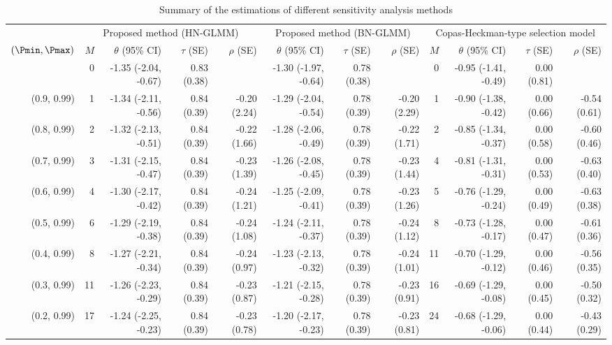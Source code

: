 \begin{table}

\caption{\label{tab:tab}Summary of the estimations of different sensitivity analysis methods}
\centering
\begin{threeparttable}
\begin{tabular}[t]{rrrrrrrrrrrr}
\toprule
\multicolumn{1}{c}{ } & \multicolumn{4}{c}{Proposed method (HN-GLMM)} & \multicolumn{3}{c}{Proposed method (BN-GLMM)} & \multicolumn{4}{c}{Copas-Heckman-type selection model} \\
\cmidrule(l{3pt}r{3pt}){2-5} \cmidrule(l{3pt}r{3pt}){6-8} \cmidrule(l{3pt}r{3pt}){9-12}
$(\Pmin, \Pmax)$ & $M$ & $\theta$ (95\% CI) & $\tau$ (SE) & $\rho$ (SE) & $\theta$ (95\% CI) & $\tau$ (SE) & $\rho$ (SE) & $M$ & $\theta$ (95\% CI) & $\tau$ (SE) & $\rho$ (SE)\\
\midrule
 & 0 & -1.35 (-2.04, -0.67) & 0.83 (0.38) &  & -1.30 (-1.97, -0.64) & 0.78 (0.38) &  & 0 & -0.95 (-1.41, -0.49) & 0.00 (0.81) & \\
(0.9, 0.99) & 1 & -1.34 (-2.11, -0.56) & 0.84 (0.39) & -0.20 (2.24) & -1.29 (-2.04, -0.54) & 0.78 (0.39) & -0.20 (2.29) & 1 & -0.90 (-1.38, -0.42) & 0.00 (0.66) & -0.54 (0.61)\\
(0.8, 0.99) & 2 & -1.32 (-2.13, -0.51) & 0.84 (0.39) & -0.22 (1.66) & -1.28 (-2.06, -0.49) & 0.78 (0.39) & -0.22 (1.71) & 2 & -0.85 (-1.34, -0.37) & 0.00 (0.58) & -0.60 (0.46)\\
(0.7, 0.99) & 3 & -1.31 (-2.15, -0.47) & 0.84 (0.39) & -0.23 (1.39) & -1.26 (-2.08, -0.45) & 0.78 (0.39) & -0.23 (1.44) & 4 & -0.81 (-1.31, -0.31) & 0.00 (0.53) & -0.63 (0.40)\\
(0.6, 0.99) & 4 & -1.30 (-2.17, -0.42) & 0.84 (0.39) & -0.24 (1.21) & -1.25 (-2.09, -0.41) & 0.78 (0.39) & -0.23 (1.26) & 5 & -0.76 (-1.29, -0.24) & 0.00 (0.49) & -0.63 (0.38)\\
(0.5, 0.99) & 6 & -1.29 (-2.19, -0.38) & 0.84 (0.39) & -0.24 (1.08) & -1.24 (-2.11, -0.37) & 0.78 (0.39) & -0.24 (1.12) & 8 & -0.73 (-1.28, -0.17) & 0.00 (0.47) & -0.61 (0.36)\\
(0.4, 0.99) & 8 & -1.27 (-2.21, -0.34) & 0.84 (0.39) & -0.24 (0.97) & -1.23 (-2.13, -0.32) & 0.78 (0.39) & -0.24 (1.01) & 11 & -0.70 (-1.29, -0.12) & 0.00 (0.46) & -0.56 (0.35)\\
(0.3, 0.99) & 11 & -1.26 (-2.23, -0.29) & 0.84 (0.39) & -0.23 (0.87) & -1.21 (-2.15, -0.28) & 0.78 (0.39) & -0.23 (0.91) & 16 & -0.69 (-1.29, -0.08) & 0.00 (0.45) & -0.50 (0.32)\\
(0.2, 0.99) & 17 & -1.24 (-2.25, -0.23) & 0.84 (0.39) & -0.23 (0.78) & -1.20 (-2.17, -0.23) & 0.78 (0.39) & -0.23 (0.81) & 24 & -0.68 (-1.29, -0.06) & 0.00 (0.44) & -0.43 (0.29)\\

\end{tabular}
\end{threeparttable}
\end{table}
